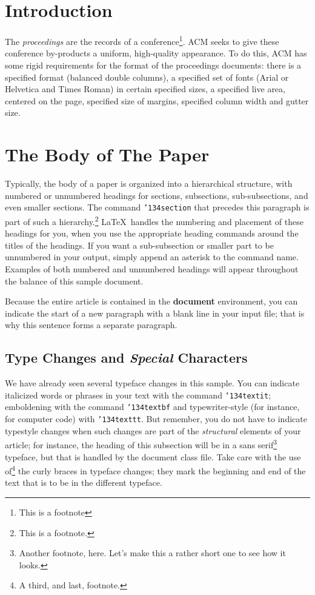 \section{Introduction}

The \textit{proceedings} are the records of a conference\footnote{This
  is a footnote}.  ACM seeks
to give these conference by-products a uniform, high-quality
appearance.  To do this, ACM has some rigid requirements for the
format of the proceedings documents: there is a specified format
(balanced double columns), a specified set of fonts (Arial or
Helvetica and Times Roman) in certain specified sizes, a specified
live area, centered on the page, specified size of margins, specified
column width and gutter size.

\section{The Body of The Paper}
Typically, the body of a paper is organized into a hierarchical
structure, with numbered or unnumbered headings for sections,
subsections, sub-subsections, and even smaller sections.  The command
\texttt{{\char'134}section} that precedes this paragraph is part of
such a hierarchy.\footnote{This is a footnote.} \LaTeX\ handles the
numbering and placement of these headings for you, when you use the
appropriate heading commands around the titles of the headings.  If
you want a sub-subsection or smaller part to be unnumbered in your
output, simply append an asterisk to the command name.  Examples of
both numbered and unnumbered headings will appear throughout the
balance of this sample document.

Because the entire article is contained in the \textbf{document}
environment, you can indicate the start of a new paragraph with a
blank line in your input file; that is why this sentence forms a
separate paragraph.

\subsection{Type Changes and {\itshape Special} Characters}

We have already seen several typeface changes in this sample.  You can
indicate italicized words or phrases in your text with the command
\texttt{{\char'134}textit}; emboldening with the command
\texttt{{\char'134}textbf} and typewriter-style (for instance, for
computer code) with \texttt{{\char'134}texttt}.  But remember, you do
not have to indicate typestyle changes when such changes are part of
the \textit{structural} elements of your article; for instance, the
heading of this subsection will be in a sans serif\footnote{Another
  footnote, here.  Let's make this a rather short one to see how it
  looks.} typeface, but that is handled by the document class file.
Take care with the use of\footnote{A third, and last, footnote.}  the
curly braces in typeface changes; they mark the beginning and end of
the text that is to be in the different typeface.


